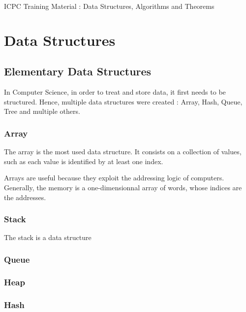 \documentclass[10pt,landscape,twocolumn]{article}
\begin{document}
\begin{center}
	\Large ICPC Training Material : Data Structures, Algorithms and Theorems 
\end{center}

\tableofcontents

\section{Data Structures}

\subsection{Elementary Data Structures}
In Computer Science, in order to treat and store data, it first needs to be structured. Hence, multiple data structures were created : Array, Hash, Queue, Tree and multiple others.

\subsubsection{Array}
The array is the most used data structure. It consists on a collection of values, such as each value is identified by at least one index. 
\begin{center}
\end{center}
Arrays are useful because they exploit the addressing logic of computers. Generally, the memory is a one-dimensionnal array of words, whose indices are the addresses.

\subsubsection{Stack}

The stack is a data structure 
\subsubsection{Queue}
\subsubsection{Heap}
\subsubsection{Hash}
\end{document}
